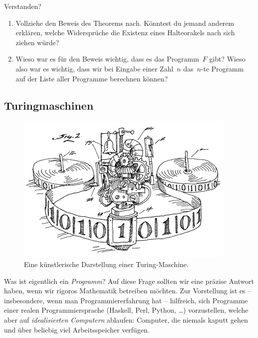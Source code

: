 \documentclass[twoside]{../zirkelblatt1415}
\theoremstyle{definition}
\theoremstyle{plain}
\theoremstyle{remark}
\begin{document}
\begin{aufgabe}{Verstanden?}
\begin{enumerate}
\item Vollziehe den Beweis des Theorems nach. Könntest du jemand anderem
erklären, welche Widersprüche die Existenz eines Halteorakels nach sich ziehen
würde?
\item Wieso war es für den Beweis wichtig, dass es das Programm~$F$ gibt? Wieso
also war es wichtig, dass wir bei Eingabe einer Zahl~$n$ das~$n$-te Programm
auf der Liste aller Programme berechnen können?
\end{enumerate}\fixlistspacing
\end{aufgabe}


\subsection{Turingmaschinen}

\setlength{\wrapoverhang}{1cm}
\setlength{\columnsep}{0.5cm}
\begin{figure}
  \vspace{-3em}
  \includegraphics[scale=0.3]{turing-machine}
  \scriptsize
  Eine künstlerische Darstellung einer
  Turing-Maschine.\footnotemark
\end{figure}

Was ist eigentlich ein \emph{Programm}? Auf diese Frage sollten wir eine
präzise Antwort haben, wenn wir rigoros Mathematik betreiben möchten. Zur
Vorstellung ist es -- insbesondere, wenn man Programmiererfahrung hat --
hilfreich, sich Programme einer realen Programmiersprache (Haskell, Perl,
Python, \ldots) vorzustellen, welche aber auf \emph{idealisierten Computern}
ablaufen: Computer, die niemals kaputt gehen und über beliebig viel
Arbeitsspeicher verfügen.
\end{document}
